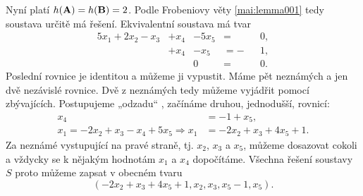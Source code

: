 \begin{example}
  Nyní platí \(h(\mathbf{A}) = h(\mathbf{B}) = 2\). Podle Frobeniovy věty \ref{mai:lemma001} tedy 
  soustava určitě má řešení. Ekvivalentní soustava má tvar
  \begin{alignat*}{5}
         x_1 + 2x_2 - x_3 &+  x_4 &- 5x_5 &=  &&0, \\
                          &+  x_4 &-  x_5 &= -&&1, \\
                          &       &     0 &=  &&0.
  \end{alignat*}
  Poslední rovnice je identitou a můžeme ji vypustit. Máme pět neznámých a jen dvě nezávislé 
  rovnice. Dvě z neznámých tedy můžeme vyjádřit pomocí zbývajících. Postupujeme „odzadu“ , začínáme 
  druhou, jednodušší, rovnicí:
  \begin{align*}
                                                x_4 &= -1 + x_5,                \\
    x_1 = - 2x_2 + x_3 - x_4 + 5x_5 \Rightarrow x_1 &= -2x_2 + x_3 + 4x_5 + 1.
  \end{align*}
  Za neznámé vystupující na pravé straně, tj. \(x_2\), \(x_3\) a \(x_5\), můžeme dosazovat cokoli a 
  vždycky se k nějakým hodnotám \(x_1\) a \(x_4\) dopočítáme. Všechna řešení soustavy \(S\) proto 
  můžeme zapsat v obecném tvaru
  \begin{equation}\label{mai:eq040}
    (-2x_2 + x_3 + 4x_5 + 1, x_2, x_3, x_5 - 1, x_5).
  \end{equation}
  \normalsize
\end{example}